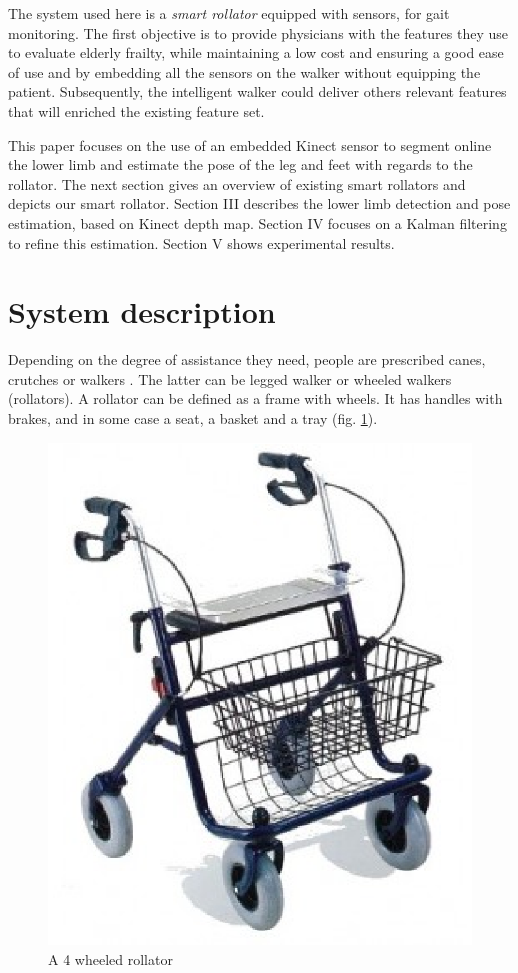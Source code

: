 \documentclass[letterpaper, 10 pt, conference]{ieeeconf}
\newcommand{\CJOK}[2]{{#1}} %
\begin{document}
The system used here is a \textit{smart rollator} equipped with sensors, for gait monitoring. The first objective is to provide physicians with the features they use to evaluate elderly frailty, while maintaining a low cost  and ensuring a good ease of use and by embedding all the sensors on the walker without equipping the patient. Subsequently, the intelligent walker could deliver others relevant features that will enriched the existing feature set. 

This paper focuses on the use of an embedded Kinect sensor to segment online the lower limb and estimate the pose of the leg and feet with regards to the rollator. The next section gives an overview of existing smart rollators and depicts our smart rollator. Section III describes the lower limb detection and pose estimation, based on Kinect depth map. Section IV focuses on a Kalman filtering to refine this estimation. Section V shows experimental results. 

\section{System description}

Depending on the degree of assistance they need, people are prescribed canes, crutches or walkers \cite{Joyce91}. The latter can be legged walker or wheeled walkers (rollators). A rollator can be defined as a frame with wheels. It has handles with brakes, and in some case a seat, a basket and a tray (\CJOK{}{see }fig. \ref{fig:rollator}).

\begin{figure}[h]
	\centering
	\includegraphics[width=0.45\columnwidth]{images/rollator.eps}
	\caption{A 4 wheeled rollator}
	\label{fig:rollator}
\end{figure}

\end{document}
